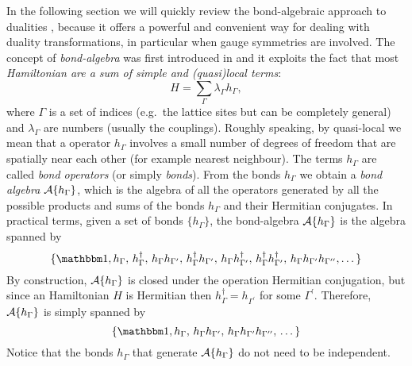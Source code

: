 In the following section we will quickly review the bond-algebraic approach to dualities \cite{cobanera2011bond}, because it offers a powerful and convenient way for dealing with duality transformations, in particular when gauge symmetries are involved.
The concept of \emph{bond-algebra} was first introduced in \cite{nussinov2009bond} and it exploits the fact that most \emph{Hamiltonian are a sum of simple and (quasi)local terms}:
\begin{equation}
    H = \sum_{\Gamma} \lambda_{\Gamma} h_{\Gamma},
\end{equation}
where $\Gamma$ is a set of indices (e.g.~the lattice sites but can be completely general) and $\lambda_{\Gamma}$ are numbers (usually the couplings).
Roughly speaking, by quasi-local we mean that a operator $h_{\Gamma}$ involves a small number of degrees of freedom that are spatially near each other (for example nearest neighbour).
The terms $h_{\Gamma}$ are called \emph{bond operators} (or simply \emph{bonds}).
From the bonds $h_{\Gamma}$ we obtain a \emph{bond algebra} $\mathcal{A}\{h_{\Gamma}\}$, which is the algebra of all the operators generated by all the possible products and sums of the bonds $h_{\Gamma}$ and their Hermitian conjugates.
In practical terms, given a set of bonds $\{h_{\Gamma}\}$, the bond-algebra $\mathcal{A}\{h_{\Gamma}\}$ is the algebra spanned by
\begin{equation*}
    \{
        \identity, h_{\Gamma}, \,
        h_{\Gamma}^{\dagger}, \,
        h_{\Gamma} h_{\Gamma^{\prime}}, \,
        h_{\Gamma}^{\dagger}  h_{\Gamma^{\prime}}, \,
        h_{\Gamma} h_{\Gamma^{\prime}}^{\dagger}, \,
        h_{\Gamma}^{\dagger}  h_{\Gamma^{\prime}}^{\dagger}, \,
        h_{\Gamma} h_{\Gamma^{\prime}} h_{\Gamma^{\prime\prime}},
        \dots
    \}
\end{equation*}
By construction, $\mathcal{A}\{h_{\Gamma}\}$ is closed under the operation Hermitian conjugation, but since an Hamiltonian $H$ is Hermitian then $h_{\Gamma}^{\dagger} = h_{\Gamma^{\prime}}$ for some $\Gamma^{\prime}$.
Therefore, $\mathcal{A} \{h_{\Gamma}\}$ is simply spanned by
\begin{equation*}
    \{
        \identity,
        h_{\Gamma}, \,
        h_{\Gamma} h_{\Gamma^{\prime}}, \,
        h_{\Gamma} h_{\Gamma^{\prime}} h_{\Gamma^{\prime\prime}}, \,
        \dots
    \}
\end{equation*}
Notice that the bonds $h_{\Gamma}$ that generate $\mathcal{A}\{ h_{\Gamma} \}$ do not need to be independent.

